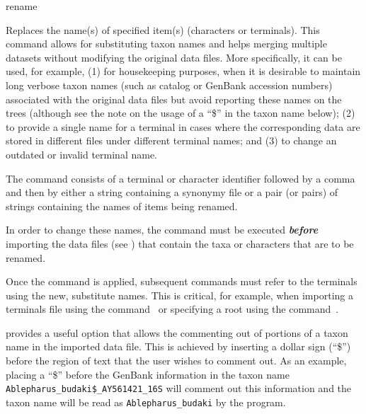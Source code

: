    
\begin{command}{rename}{}

	
	\begin{poydescription} 
        Replaces the name(s) of specified item(s) (characters or terminals). This command allows 
        for substituting taxon names and helps merging multiple datasets without modifying the original
        data files. More specifically, it can be used, for example, (1) for housekeeping purposes,
        when it is desirable to maintain long verbose taxon names (such as catalog or GenBank
        accession numbers) associated with the original data files but avoid reporting these 
        names on the trees (although see the note on the usage of a ``\$'' in the taxon name below); 
        (2) to provide a single name for a terminal in cases where the corresponding
        data are stored in different files under different terminal names; and (3) to change an
        outdated or invalid terminal name.
        
        The command consists of a terminal or character identifier followed by a comma and then by
        either a string containing a synonymy file or a pair (or pairs) of strings containing the names of
        items being renamed.
        
         In order to change these names, the command  must be
        executed {\bf \emph{before}} importing the data files (see  )
        that contain the taxa or characters that are to be renamed.
	\end{poydescription}  
	              
    \begin{statement}
        Once the command  is applied, subsequent commands 
        must refer to the terminals using the new, substitute names. This is critical, for example,
        when importing a terminals file using the command~ or specifying
        a root using the command~.
    \end{statement}
          
    \begin{statement}
          \poy provides a useful option that allows the commenting out of portions of a taxon name in the imported
          data file. This is achieved by inserting a dollar sign (``\$'') before the region of text that the user wishes to comment 
          out.  As an example, placing a ``\$''  before the GenBank information in the taxon name 
          \texttt{Ablepharus\_budaki\$\_AY561421\_16S} will comment out this information and the taxon 
          name will be read as \texttt{Ablepharus\_budaki} by the program.
    \end{statement}
          

\end{command}
